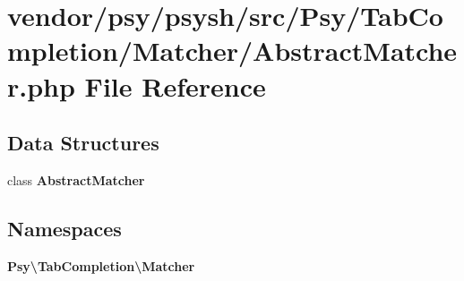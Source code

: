 \section{vendor/psy/psysh/src/\+Psy/\+Tab\+Completion/\+Matcher/\+Abstract\+Matcher.php File Reference}
\label{_abstract_matcher_8php}
\subsection*{Data Structures}
\begin{DoxyCompactItemize}
\item 
class {\bf Abstract\+Matcher}
\end{DoxyCompactItemize}
\subsection*{Namespaces}
\begin{DoxyCompactItemize}
\item 
 {\bf Psy\textbackslash{}\+Tab\+Completion\textbackslash{}\+Matcher}
\end{DoxyCompactItemize}

